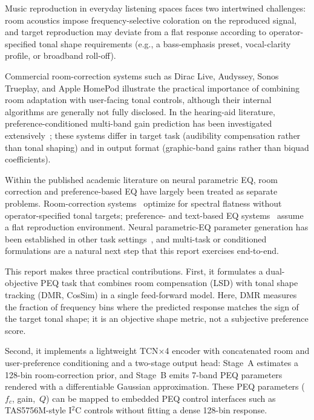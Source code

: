 \documentclass{aes2e}
\begin{document}
Music reproduction in everyday listening spaces faces two intertwined
challenges: room acoustics impose frequency-selective coloration on the
reproduced signal, and target reproduction may deviate from a flat
response according to operator-specified tonal shape requirements
(e.g., a bass-emphasis preset, vocal-clarity profile, or broadband
roll-off).

Commercial room-correction systems such as Dirac Live, Audyssey,
Sonos Trueplay, and Apple HomePod illustrate the practical importance of
combining room adaptation with user-facing tonal controls, although their
internal algorithms are generally not fully disclosed. In the hearing-aid
literature, preference-conditioned multi-band gain prediction has been
investigated extensively~\cite{keidser2006,nielsen2013,mondol2022};
these systems differ in target task (audibility compensation rather than
tonal shaping) and in output format (graphic-band gains rather than
biquad coefficients).

Within the published academic literature on neural parametric EQ, room
correction and preference-based EQ have largely been treated as separate
problems. Room-correction systems~\cite{miyoshi1988,pepe2020,pepe2022}
optimize for spectral flatness without operator-specified tonal targets;
preference- and text-based EQ systems~\cite{cartwright2013,seetharaman2016,
chu2025,stylianou2026} assume a flat reproduction environment.
Neural parametric-EQ parameter generation has been established in other
task settings~\cite{nercessian2020,nercessian2021_hc,colonel2022,
steinmetz2022}, and multi-task or conditioned formulations are a natural
next step that this report exercises end-to-end.

This report makes three practical contributions. First, it formulates a
dual-objective PEQ task that combines room compensation (LSD) with tonal
shape tracking (DMR, CosSim) in a single feed-forward model. Here, DMR
measures the fraction of frequency bins where the predicted response
matches the sign of the target tonal shape; it is an objective shape metric,
not a subjective preference score.

Second, it implements a lightweight \mbox{TCN$\times$4} encoder with
concatenated room and user-preference conditioning and a two-stage output
head: Stage~A estimates a 128-bin room-correction prior, and Stage~B emits
7-band PEQ parameters rendered with a differentiable Gaussian
approximation. These PEQ parameters ($f_c$, gain,~$Q$) can be mapped to
embedded PEQ control interfaces such as TAS5756M-style I$^2$C controls
without fitting a dense 128-bin response.
\end{document}
